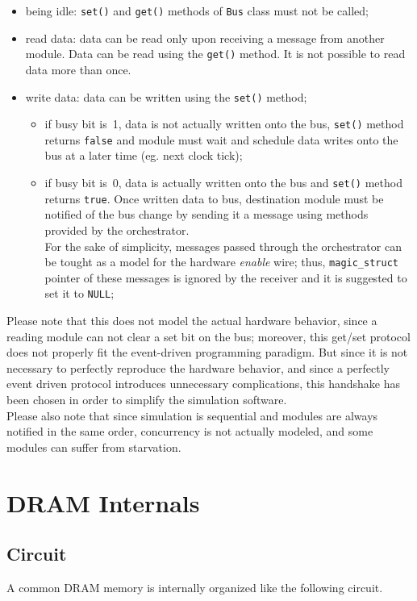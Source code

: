 \documentclass[a4paper,12pt]{article}
\begin{document}
\begin{itemize}
  \item being idle: \texttt{set()} and \texttt{get()} methods of \texttt{Bus} class must not be called;
  \item read data: data can be read only upon receiving a message from another module. Data can be read using the \texttt{get()} method. It is not possible to read data more than once.
  \item write data: data can be written using the \texttt{set()} method;
  \begin{itemize}
    \item if busy bit is~1, data is not actually written onto the bus, \texttt{set()} method returns \texttt{false} and module must wait and schedule data writes onto the bus at a later time (eg. next clock tick);
    \item if busy bit is~0, data is actually written onto the bus and \texttt{set()} method returns \texttt{true}.
    Once written data to bus, destination module must be notified of the bus change by sending it a message using methods provided by the orchestrator.\\
    For the sake of simplicity, messages passed through the orchestrator can be tought as a model for the hardware \emph{enable} wire; thus, \texttt{magic\_struct} pointer of these messages is ignored by the receiver and it is suggested to set it to \texttt{NULL};
  \end{itemize}
\end{itemize}

Please note that this does not model the actual hardware behavior, since a reading module can not clear a set bit on the bus;
moreover, this get/set protocol does not properly fit the event-driven programming paradigm.
But since it is not necessary to perfectly reproduce the hardware behavior, and since a perfectly event driven protocol introduces unnecessary complications, this handshake has been chosen in order to simplify the simulation software.\\

Please also note that since simulation is sequential and modules are always notified in the same order, concurrency is not actually modeled, and some modules can suffer from starvation.

\section{DRAM Internals}
\subsection{Circuit}
A common DRAM memory is internally organized like the following circuit.
\end{document}
